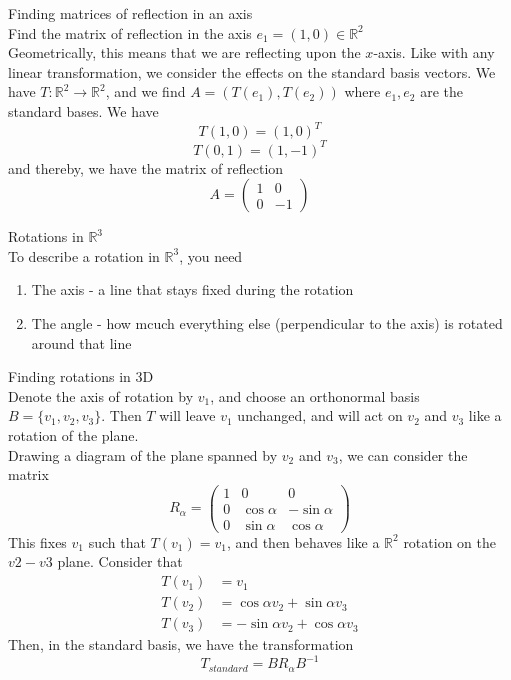 \documentclass[journal, letterpaper]{IEEEtran}
\begin{document}
    \begin{myboxg}{Finding matrices of reflection in an axis} \\ 
        Find the matrix of reflection in the axis $e_1 = (1, 0) \in \mathbb{R}^2$
        \newline \\ 
        Geometrically, this means that we are reflecting upon the $x$-axis. Like with any linear transformation, we consider
        the effects on the standard basis vectors. We have $T : \mathbb{R}^2 \to \mathbb{R}^2$, and we find $A = (T(e_1), T(e_2))$ where $e_1, e_2$ are the standard bases. We have
        $$ T(1, 0) = (1, 0)^T$$
        $$ T(0, 1) = (1, -1)^T$$
        and thereby, we have the matrix of reflection
        $$ A = \begin{pmatrix}
            1 & 0 \\ 0 & -1
        \end{pmatrix}$$
    \end{myboxg}
    \begin{mybox}{Rotations in $\mathbb{R}^3$} \\
        To describe a rotation in $\mathbb{R}^3$, you need
        \begin{enumerate}
            \item The axis - a line that stays fixed during the rotation
            \item The angle - how mcuch everything else (perpendicular to the axis) is rotated around that line
        \end{enumerate}
    \end{mybox}
    \begin{myboxr}{Finding rotations in 3D} \\
        Denote the axis of rotation by $v_1$, and choose an orthonormal basis $B = \{v_1, v_2, v_3 \}$. Then $T$ will leave $v_1$ unchanged, and will act on $v_2$ and $v_3$ like a rotation of the plane. 
        \newline \\ 
        Drawing a diagram of the plane spanned by $v_2$ and $v_3$, we can consider the matrix
        $$ R_{\alpha} = \begin{pmatrix}
            1 & 0 & 0 \\ 0 & \cos\alpha & - \sin\alpha \\ 0 & \sin\alpha & \cos\alpha
        \end{pmatrix}$$
        This fixes $v_1$ such that $T(v_1) = v_1$, and then behaves like a $\mathbb{R}^2$ rotation on the $v2 - v3$ plane. Consider that
        \begin{align*}
            T(v_1) &= v_1 \\ 
            T(v_2) &= \cos\alpha v_2 + \sin\alpha v_3 \\ 
            T(v_3) &= -\sin\alpha v_2 + \cos\alpha v_3
        \end{align*}
        Then, in the standard basis, we have the transformation
        $$ T_{standard} = BR_\alpha B^{-1}$$
    \end{myboxr}
\end{document}
